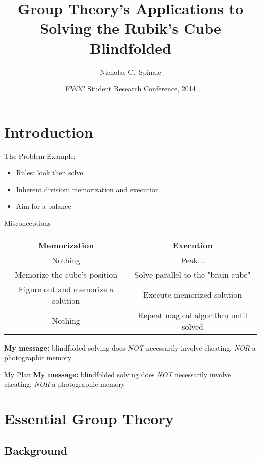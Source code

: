 \documentclass{beamer}
\title{Group Theory's Applications to \\ Solving the Rubik's Cube Blindfolded}
\author{Nicholas C.~Spinale}
\institute{Department of Mathematics \\ Flathead Valley Community College}
\date{FVCC Student Research Conference, 2014}
\begin{document}
		
				\begin{frame}
				\titlepage
				\end{frame}
		
		\section*{Introduction}

				\begin{frame}{The Problem}
					Example: \href{https://www.youtube.com/watch?v=mCyYPimImyM}{\beamergotobutton{Link}}
					\begin{itemize}
						\item Rules: look then solve
						\item Inherent division: memorization and execution
						\item Aim for a balance
					\end{itemize}
					Misconceptions
					\begin{table}
						\centering \footnotesize
						\begin{tabular}{|c||c|} \hline
							\small Memorization & \small Execution \\[.1cm] \hline \hline
							Nothing & Peak... \\ \hline
							Memorize the cube's position & Solve parallel to the "brain cube" \\ \hline
							Figure out and memorize a solution & Execute memorized solution \\ \hline
							Nothing & Repeat magical algorithm until solved \\ \hline
						\end{tabular}
					\end{table}
					\textbf{My message:} blindfolded solving does \emph{NOT} necessarily involve cheating, \emph{NOR} a photographic memory
				\end{frame}

				\begin{frame}{My Plan}
				\textbf{My message:} blindfolded solving does \emph{NOT} necessarily involve cheating, \emph{NOR} a photographic memory \\[.4cm]
				\tableofcontents
				\end{frame}

		\section{Essential Group Theory}

			\subsection{Background}
		
\end{document}
